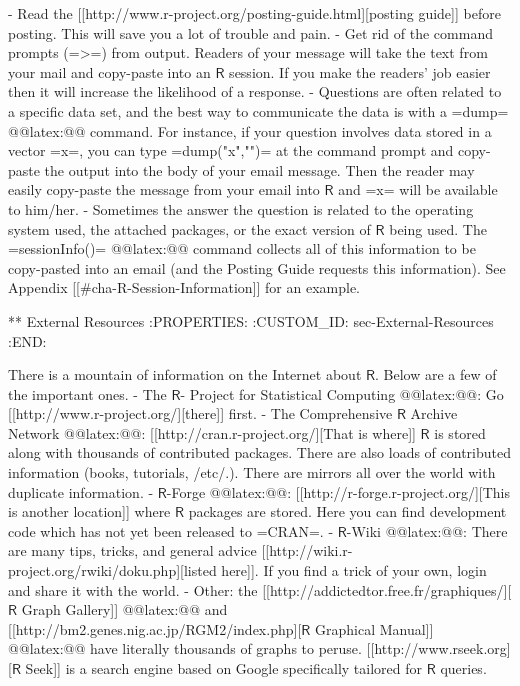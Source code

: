 - Read the [[http://www.r-project.org/posting-guide.html][posting guide]] before posting. This will save you a lot of
  trouble and pain.
- Get rid of the command prompts (=>=) from output. Readers of your
  message will take the text from your mail and copy-paste into an
  \(\mathsf{R}\) session. If you make the readers' job easier then it
  will increase the likelihood of a response.
- Questions are often related to a specific data set, and the best way
  to communicate the data is with a =dump= @@latex:@@
  command. For instance, if your question involves data stored in a
  vector =x=, you can type =dump("x","")= at the command prompt and
  copy-paste the output into the body of your email message. Then the
  reader may easily copy-paste the message from your email into
  \(\mathsf{R}\) and =x= will be available to him/her.
- Sometimes the answer the question is related to the operating system
  used, the attached packages, or the exact version of \(\mathsf{R}\)
  being used. The =sessionInfo()=
  @@latex:@@ command collects
  all of this information to be copy-pasted into an email (and the
  Posting Guide requests this information). See Appendix
  [[#cha-R-Session-Information]] for an example.

** External Resources
:PROPERTIES:
:CUSTOM_ID: sec-External-Resources
:END:

There is a mountain of information on the Internet about
\(\mathsf{R}\). Below are a few of the important ones.
- The \(\mathsf{R}\)- Project for Statistical Computing @@latex:@@: Go [[http://www.r-project.org/][there]] first.
- The Comprehensive \(\mathsf{R}\) Archive Network
  @@latex:@@: [[http://cran.r-project.org/][That is
  where]] \(\mathsf{R}\) is stored along with thousands of contributed
  packages. There are also loads of contributed information (books,
  tutorials, /etc/.). There are mirrors all over the world with
  duplicate information.
- \(\mathsf{R}\)-Forge @@latex:@@: [[http://r-forge.r-project.org/][This is
  another location]] where \(\mathsf{R}\) packages are stored. Here you
  can find development code which has not yet been released to =CRAN=.
- \(\mathsf{R}\)-Wiki @@latex:@@: There are many
  tips, tricks, and general advice [[http://wiki.r-project.org/rwiki/doku.php][listed here]]. If you find a trick of
  your own, login and share it with the world.
- Other: the [[http://addictedtor.free.fr/graphiques/][\(\mathsf{R}\) Graph Gallery]] @@latex:@@ and [[http://bm2.genes.nig.ac.jp/RGM2/index.php][\(\mathsf{R}\) Graphical
  Manual]] @@latex:@@ have
  literally thousands of graphs to peruse. [[http://www.rseek.org][\(\mathsf{R}\) Seek]] is a
  search engine based on Google specifically tailored for
  \(\mathsf{R}\) queries.

